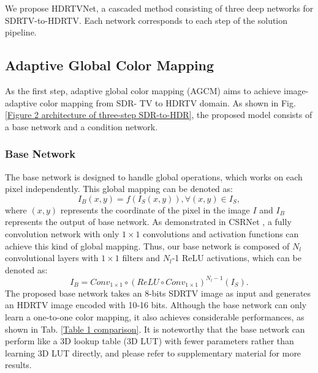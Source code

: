 \documentclass[10pt,twocolumn,letterpaper]{article}
\begin{document}
We propose HDRTVNet, a cascaded method consisting of three deep networks for SDRTV-to-HDRTV. Each network corresponds to each step of the solution pipeline.

\vspace{-4pt}
\subsection{Adaptive Global Color Mapping}
As the first step, adaptive global color mapping (AGCM) aims to achieve image-adaptive color mapping from SDR- TV to HDRTV domain. As shown in Fig. \ref{Figure 2 architecture of three-step SDR-to-HDR}, the proposed model consists of a base network and a condition network.

\subsubsection{Base Network}
The base network is designed to handle global operations, which works on each pixel independently. This global mapping can be denoted as:
\begin{equation}
   I_{B}(x,y)=f(I_{S}(x,y)), \forall (x,y)\in I_{S},
\end{equation}
where $(x,y)$ represents the coordinate of the pixel in the image $I$ and $I_{B}$ represents the output of base network. As demonstrated in CSRNet \cite{liu2021very}, a fully convolution network with only $1\times 1$ convolutions and activation functions can achieve this kind of global mapping. Thus, our base network is composed of $N_l$ convolutional layers with $1\times 1$ filters and $N_l$-1 ReLU activations, which can be denoted as:
\begin{equation}
   I_{B}=Conv_{1\times 1}\circ (ReLU\circ Conv_{1\times 1})^{N_l-1}(I_{S}).
\end{equation}
The proposed base network takes an 8-bits SDRTV image as input and generates an HDRTV image encoded with 10-16 bits. Although the base network can only learn a one-to-one color mapping, it also achieves considerable performances, as shown in Tab. \ref{Table 1 comparison}. It is noteworthy that the base network can perform like a 3D lookup table (3D LUT) with fewer parameters rather than learning 3D LUT directly, and please refer to supplementary material for more results.
\end{document}
